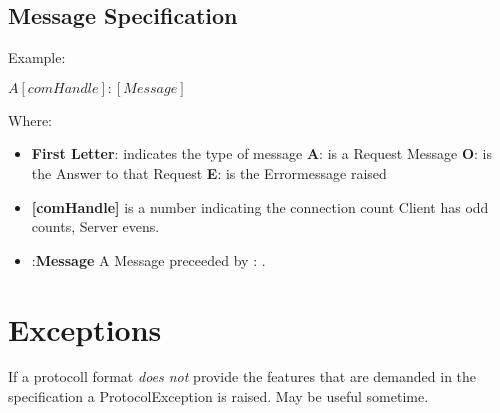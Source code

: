 \documentclass{scrartcl}
\begin{document}
	\subsection{Message Specification}
	Example:	\begin{center}{$A[comHandle]:[Message]$}\end{center}
	Where:
	\begin{itemize}
	
		\item \textbf{First Letter}: \quad indicates the type of message
			\subitem \textbf{A}: \quad is a Request Message
			\subitem \textbf{O}: \quad is the Answer to that Request
			\subitem \textbf{E}: \quad is the Errormessage raised
		\item \textbf{[comHandle]} \quad is a number indicating the connection count Client has odd counts, Server evens.
		\item :\textbf{Message} A Message preceeded by : .

	\end{itemize}
	\section{Exceptions}
	If a protocoll format \emph{does not} provide the features that are demanded in the specification a ProtocolException is raised.
	May be useful sometime.
\end{document}
